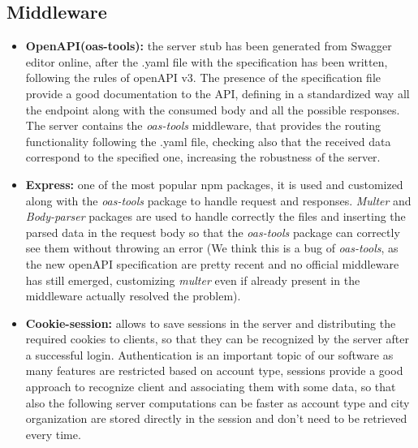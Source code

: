 \subsection{Middleware}
\begin{itemize}
	\item \textbf{OpenAPI(oas-tools):} the server stub has been generated from Swagger editor online, after the .yaml file with the specification has been written, following the rules of openAPI v3. The presence of the specification file provide a good documentation to the API, defining in a standardized way all the endpoint along with the consumed body and all the possible responses. The server contains the \textit{oas-tools} middleware, that provides the routing functionality following the .yaml file, checking also that the received data correspond to the specified one, increasing the robustness of the server.
	
	\item \textbf{Express:} one of the most popular npm packages, it is used and customized along with the \textit{oas-tools} package to handle request and responses. \textit{Multer} and \textit{Body-parser} packages are used to handle correctly the files and inserting the parsed data in the request body so that the \textit{oas-tools} package can correctly see them without throwing an error (We think this is a bug of \textit{oas-tools}, as the new openAPI specification are pretty recent and no official middleware has still emerged, customizing \textit{multer} even if already present in the middleware actually resolved the problem).
	
	\item \textbf{Cookie-session:} allows to save sessions in the server and distributing the required cookies to clients, so that they can be recognized by the server after a successful login. Authentication is an important topic of our software as many features are restricted based on account type, sessions provide a good approach to recognize client and associating them with some data, so that also the following server computations can be faster as account type and city organization are stored directly in the session and don't need to be retrieved every time.
\end{itemize}

